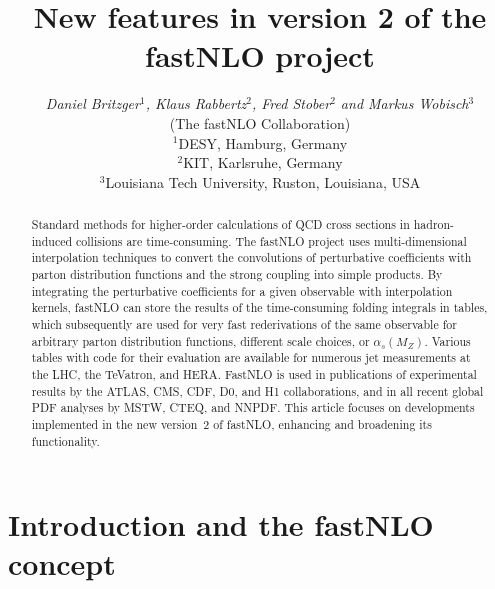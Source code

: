 \documentclass{DISproc}
\begin{document}
\title{New features in version 2 of the fastNLO project}

\author{{\slshape Daniel Britzger$^1$, Klaus Rabbertz$^2$, Fred Stober$^2$ and Markus Wobisch$^3$}\\
  (The fastNLO Collaboration)\\[1ex]
  $^1$DESY, Hamburg, Germany\\
  $^2$KIT, Karlsruhe, Germany\\
  $^3$Louisiana Tech University, Ruston, Louisiana, USA}



\doi %

\maketitle

\begin{abstract}
  Standard methods for higher-order calculations of QCD cross sections
  in hadron-induced collisions are time-consuming. The fastNLO project
  uses multi-dimensional interpolation techniques to convert the
  convolutions of perturbative coefficients with parton distribution
  functions and the strong coupling into simple products.  By
  integrating the perturbative coefficients for a given observable
  with interpolation kernels, fastNLO can store the results of the
  time-consuming folding integrals in tables, which subsequently are
  used for very fast rederivations of the same observable for
  arbitrary parton distribution functions, different scale choices, or
  $\alpha_s(M_Z)$.  Various tables with code for their evaluation are
  available for numerous jet measurements at the LHC, the TeVatron,
  and HERA\@. FastNLO is used in publications of experimental
  results by the ATLAS, CMS, CDF, D0, and H1 collaborations, and in
  all recent global PDF analyses by MSTW, CTEQ, and NNPDF\@. This
  article focuses on developments implemented in the new version~2 of
  fastNLO, enhancing and broadening its functionality.
\end{abstract}



\section{Introduction and the fastNLO concept}
\end{document}
